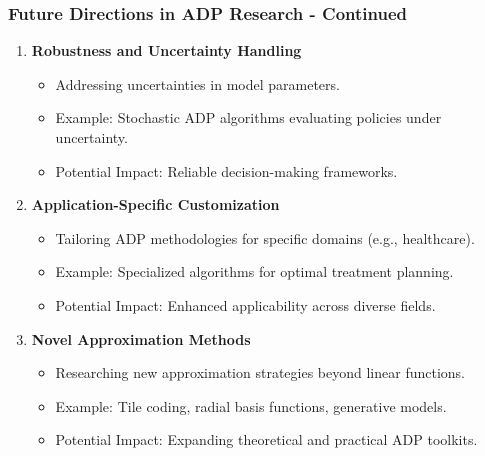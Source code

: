 \documentclass[aspectratio=169]{beamer}
\begin{document}
\begin{frame}[fragile]
    \frametitle{Future Directions in ADP Research - Continued}
    \begin{enumerate}[resume]
        \item \textbf{Robustness and Uncertainty Handling}
            \begin{itemize}
                \item Addressing uncertainties in model parameters.
                \item Example: Stochastic ADP algorithms evaluating policies under uncertainty.
                \item Potential Impact: Reliable decision-making frameworks.
            \end{itemize}
            
        \item \textbf{Application-Specific Customization}
            \begin{itemize}
                \item Tailoring ADP methodologies for specific domains (e.g., healthcare).
                \item Example: Specialized algorithms for optimal treatment planning.
                \item Potential Impact: Enhanced applicability across diverse fields.
            \end{itemize}
            
        \item \textbf{Novel Approximation Methods}
            \begin{itemize}
                \item Researching new approximation strategies beyond linear functions.
                \item Example: Tile coding, radial basis functions, generative models.
                \item Potential Impact: Expanding theoretical and practical ADP toolkits.
            \end{itemize}
    \end{enumerate}
\end{frame}
\end{document}
